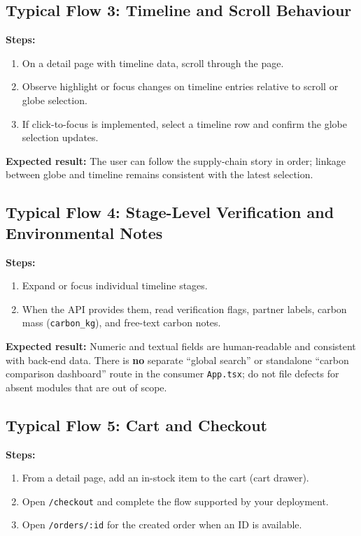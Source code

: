 \documentclass[11pt]{article}
\begin{document}
\subsection{Typical Flow 3: Timeline and Scroll Behaviour}
\textbf{Steps:}
\begin{enumerate}[leftmargin=2.2em]
    \item On a detail page with timeline data, scroll through the page.
    \item Observe highlight or focus changes on timeline entries relative to scroll or globe selection.
    \item If click-to-focus is implemented, select a timeline row and confirm the globe selection updates.
\end{enumerate}

\textbf{Expected result:}
The user can follow the supply-chain story in order; linkage between globe and timeline remains consistent with the latest selection.

\subsection{Typical Flow 4: Stage-Level Verification and Environmental Notes}
\textbf{Steps:}
\begin{enumerate}[leftmargin=2.2em]
    \item Expand or focus individual timeline stages.
    \item When the API provides them, read verification flags, partner labels, carbon mass (\texttt{carbon\_kg}), and free-text carbon notes.
\end{enumerate}

\textbf{Expected result:}
Numeric and textual fields are human-readable and consistent with back-end data. There is \textbf{no} separate ``global search'' or standalone ``carbon comparison dashboard'' route in the consumer \texttt{App.tsx}; do not file defects for absent modules that are out of scope.

\subsection{Typical Flow 5: Cart and Checkout}
\textbf{Steps:}
\begin{enumerate}[leftmargin=2.2em]
    \item From a detail page, add an in-stock item to the cart (cart drawer).
    \item Open \texttt{/checkout} and complete the flow supported by your deployment.
    \item Open \texttt{/orders/:id} for the created order when an ID is available.
\end{enumerate}
\end{document}
